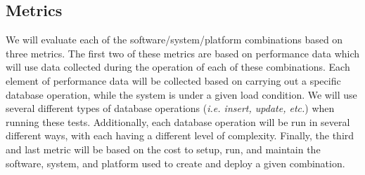 \documentclass{article}[12pt]
\numberwithin{equation}{section}
\begin{document}
\begin{flushleft}


\vspace{0.25in}	
	

\section{Metrics}

\begin{spacing}{1.5}
We will evaluate each of the software/system/platform combinations based on three metrics.  The first two of these metrics are based on performance data which will use data collected during the operation of each of these combinations.  Each element of performance data will be collected based on carrying out a specific database operation, while the system is under a given load condition.  We will use several different types of database operations (\emph{i.e. insert, update, etc.}) when running these tests.  Additionally, each database operation will be run in several different ways, with each having a different level of complexity.  Finally, the third and last metric will be based on the cost to setup, run, and maintain the software, system, and platform used to create and deploy a given combination.  
\end{spacing}


























































































\end{flushleft}
\end{document}
